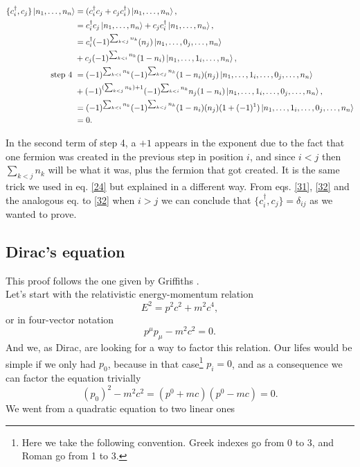 \begin{equation}
  \begin{aligned}[b]
    \{c_i^\dagger, c_j\}\ket{n_1,\ldots,n_n} &= (c_i^\dagger c_j + c_j c_i^\dagger)\ket{n_1,\ldots,n_n}, \\
    &= c_i^\dagger c_j \ket{n_1,\ldots,n_n} + c_j c_i^\dagger \ket{n_1,\ldots,n_n},\\
    &= c_i^\dagger (-1)^{\sum_{k<j}n_k}(n_j)\ket{n_1,\ldots,0_j,\ldots,n_n} \\
    &+ c_j (-1)^{\sum_{k<i}n_k}(1-n_i) \ket{n_1,\ldots,1_i,\ldots,n_n},\\
  \text{step 4 }  &= (-1)^{\sum_{k<i}n_k} (-1)^{\sum_{k<j}n_k}(1-n_i)(n_j)\ket{n_1,\ldots,1_i,\ldots,0_j,\ldots,n_n} \\
    &+ (-1)^{(\sum_{k<j}n_k) + 1} (-1)^{\sum_{k<i}n_k}n_j(1-n_i) \ket{n_1,\ldots,1_i,\ldots,0_j,\ldots,n_n},\\
    &= (-1)^{\sum_{k<i}n_k} (-1)^{\sum_{k<j}n_k}(1-n_i)(n_j)(1+(-1)^1)\ket{n_1,\ldots,1_i,\ldots,0_j,\ldots,n_n}\\
    &=0.
  \end{aligned}
  \label{32}
\end{equation}


In the second term of step 4, a $+1$ appears in the exponent due to the fact that one fermion was created in the previous step in position $i$, and since $i<j$ then $\sum_{k<j}n_k$ will be what it was, plus the fermion that got created. It is the same trick we used in eq. \ref{24} but explained in a different way. From eqs. \ref{31}, \ref{32} and the analogous eq. to \ref{32} when $i>j$ we can conclude that  $\{c_i^\dagger,c_j\} = \delta_{ij}$ as we wanted to prove.\\


\subsection{Dirac's equation}
This proof follows the one given by Griffiths \cite{griffiths}.\\
Let's start with the relativistic energy-momentum relation
\begin{equation}
  E^2 = p^2 c^2 + m^2 c^4,
\end{equation}
or in four-vector notation
\begin{equation}
  p^\mu p_\mu - m^2c^2 = 0.
  \label{covmom}
\end{equation}
And we, as Dirac, are looking for a way to factor this relation. Our lifes would be simple if we only had $p_0$, because in that case\footnote{Here we take the following convention. Greek indexes go from 0 to 3, and Roman go from 1 to 3.} $p_i = 0$, and as a consequence we can factor the equation trivially
\begin{equation*}
  (p_0)^2 - m^2 c^2 = (p^0 + mc)(p^0 - mc) = 0.
\end{equation*}
We went from a quadratic equation to two linear ones

